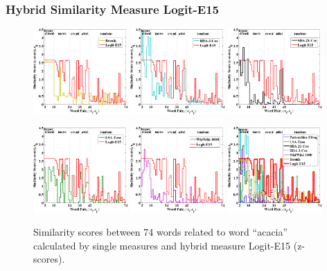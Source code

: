 \documentclass{beamer}
\begin{document}
\begin{frame}
\frametitle{Hybrid Similarity Measure Logit-E15}
\begin{figure}
\centering
\includegraphics[width=0.32\textwidth]{figures/acacia-resnik} 
\includegraphics[width=0.32\textwidth]{figures/acacia-bda}
\includegraphics[width=0.32\textwidth]{figures/acacia-sda}

\includegraphics[width=0.32\textwidth]{figures/acacia-lsa}
\includegraphics[width=0.32\textwidth]{figures/acacia-ww}
\includegraphics[width=0.32\textwidth]{figures/acacia}
\caption{ Similarity scores between 74 words related to word ``acacia'' calculated by single measures and hybrid measure Logit-E15 (z-scores). }
\label{fig:hybrid-complimentary-discussion}
\end{figure}

\end{frame}
\end{document}
